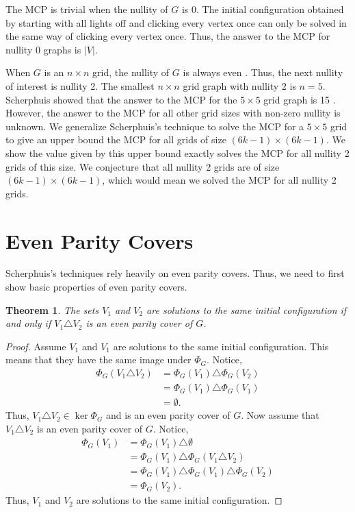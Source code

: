 \documentclass[a4paper]{article}
\newtheorem{theorem}{Theorem}
\newcommand{\abs}[1]{\left| #1 \right|}
\begin{document}
	The MCP is trivial when the nullity of $G$ is 0.
	The initial configuration obtained by starting with all lights off and clicking every vertex once can only be solved in the same way of clicking every vertex once.
	Thus, the answer to the MCP for nullity 0 graphs is $\abs{V}$.
	
	When $G$ is an $n \times n$ grid, the nullity of $G$ is always even \cite{Sutner1989}.
	Thus, the next nullity of interest is nullity 2.
	The smallest $n \times n$ grid graph with nullity 2 is $n=5$.
	Scherphuis showed that the answer to the MCP for the $5 \times 5$ grid graph is 15 \cite{jaap}.
	However, the answer to the MCP for all other grid sizes with non-zero nullity is unknown. 
	We generalize Scherphuis's technique to solve the MCP for a $5 \times 5$ grid to give an upper bound the MCP for all grids of size $(6k-1) \times (6k-1)$.
	We show the value given by this upper bound exactly solves the MCP for all nullity 2 grids of this size.
	We conjecture that all nullity 2 grids are of size $(6k-1) \times (6k-1)$, which would mean we solved the MCP for all nullity 2 grids.
	
	\section{Even Parity Covers}
	Scherphuis's techniques rely heavily on even parity covers.
	Thus, we need to first show basic properties of even parity covers.
	
	\begin{theorem}\label{iff-even-parity}
		The sets $V_1$ and $V_2$ are solutions to the same initial configuration if and only if $V_1 \triangle V_2$ is an even parity cover of $G$.
	\end{theorem}
	\begin{proof}
		Assume $V_1$ and $V_1$ are solutions to the same initial configuration.
		This means that they have the same image under $\Phi_G$.
		Notice,
		\begin{align*}
			\Phi_G(V_1 \triangle V_2) &= \Phi_G(V_1) \triangle \Phi_G(V_2) \\
				&= \Phi_G(V_1) \triangle \Phi_G(V_1) \\
				&= \emptyset.
		\end{align*}
		Thus, $V_1 \triangle V_2 \in \ker{\Phi_G}$ and is an even parity cover of $G$.
		Now assume that $V_1 \triangle V_2$ is an even parity cover of $G$.
		Notice,
		\begin{align*}
			\Phi_G(V_1) &= \Phi_G(V_1) \triangle \emptyset \\
				&= \Phi_G(V_1) \triangle \Phi_G(V_1 \triangle V_2) \\
				&= \Phi_G(V_1) \triangle \Phi_G(V_1) \triangle \Phi_G(V_2) \\
				&= \Phi_G(V_2).
		\end{align*}
		Thus, $V_1$ and $V_2$ are solutions to the same initial configuration.
	\end{proof}
\end{document}
